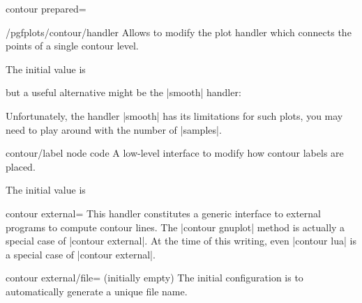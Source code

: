 {{\begin{plottype}[/pgfplots]{contour prepared=\textcolor{black}{}}
    \begin{stylekey}{/pgfplots/contour/handler}
        Allows to modify the plot handler which connects the points of a single
        contour level.

        The initial value is
\begin{codeexample}
\end{codeexample}
        but a useful alternative might be the |smooth| handler:
\pgfplotsexpensiveexample
\begin{codeexample}[]
\end{codeexample}
        Unfortunately, the \tikzname{} handler |smooth| has its limitations for
        such plots, you may need to play around with the number of |samples|.
    \end{stylekey}

    \begin{pgfplotscodekey}{contour/label node code}
        A low-level interface to modify how contour labels are placed.

        The initial value is
\begin{codeexample}
\end{codeexample}
    \end{pgfplotscodekey}
\end{plottype}

\begin{plottype}[/pgfplots]{
    contour external=\textcolor{black}{}%
}
    This handler constitutes a generic interface to external programs to
    compute contour lines. The |contour gnuplot| method is actually a special
    case of |contour external|. At the time of this writing, even |contour lua| is a special case of |contour external|.

    \begin{pgfplotskey}{contour external/file= (initially empty)}
        The initial configuration is to automatically generate a unique file name.
    \end{pgfplotskey}


\end{plottype}}}
